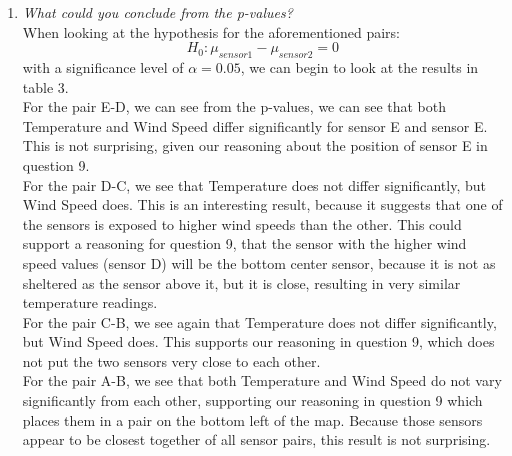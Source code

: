 \documentclass[a4paper,12pt]{article} %
\begin{document}
\begin{enumerate}
\begin{table}[H]
\centering
{}
\caption{Results of Student's T-test for four pairs of sensors concerning the variables Temperature and Wind Speed.}
\label{tab:t_test-table}
\end{table}
\item{\it What could you conclude from the p-values?}
\\When looking at the hypothesis for the aforementioned pairs:
\[ H_0: \mu_{sensor 1} - \mu_{sensor 2} = 0 \]
with a significance level of $\alpha = 0.05$, we can begin to look at the results in table 3. 
\newline
\\For the pair E-D, we can see from the p-values, we can see that both Temperature and Wind Speed differ significantly for sensor E and sensor E. This is not surprising, given our reasoning about the position of sensor E in question 9. 
\\For the pair D-C, we see that Temperature does not differ significantly, but Wind Speed does. This is an interesting result, because it suggests that one of the sensors is exposed to higher wind speeds than the other. This could support a reasoning for question 9, that the sensor with the higher wind speed values (sensor D) will be the bottom center sensor, because it is not as sheltered as the sensor above it, but it is close, resulting in very similar temperature readings.
\\For the pair C-B, we see again that Temperature does not differ significantly, but Wind Speed does. This supports our reasoning in question 9, which does not put the two sensors very close to each other.
\\For the pair A-B, we see that both Temperature and Wind Speed do not vary significantly from each other, supporting our reasoning in question 9 which places them in a pair on the bottom left of the map. Because those sensors appear to be closest together of all sensor pairs, this result is not surprising. 
\newpage


\end{enumerate}
\end{document}
